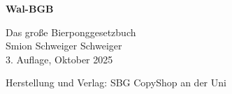 \documentclass[a5paper, 12pt]{book}
\begin{document}
\renewcommand{\listfigurename}{Abbildungs- verzeichnis}
\begin{titlepage}
\begin{center}
{\fontsize{40}{48}\selectfont \textbf{Wal-BGB}\par}

\begin{large}
\vspace{0.3cm}
Das große Bierponggesetzbuch\\
\vspace{1cm}
Smion Schweiger Schweiger\\
\vspace{1cm}
3. Auflage, Oktober 2025
\end{large}
\end{center}
\vspace{6cm}
Herstellung und Verlag: SBG CopyShop an der Uni
\end{titlepage}
\end{document}
